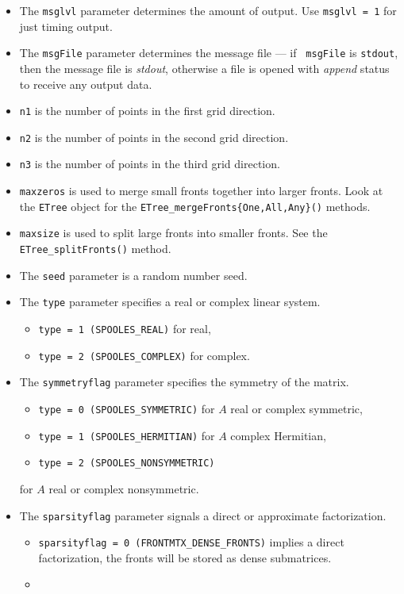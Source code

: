 \begin{enumerate}
\begin{itemize}
\item
The {\tt msglvl} parameter determines the amount of output.
Use {\tt msglvl = 1} for just timing output.
\item
The {\tt msgFile} parameter determines the message file --- if {\tt
msgFile} is {\tt stdout}, then the message file is {\it stdout},
otherwise a file is opened with {\it append} status to receive any
output data.
\item
{\tt n1} is the number of points in the first grid direction.
\item
{\tt n2} is the number of points in the second grid direction.
\item
{\tt n3} is the number of points in the third grid direction.
\item
{\tt maxzeros} is used to merge small fronts together into larger
fronts.
Look at the {\tt ETree} object for
the {\tt ETree\_mergeFronts\{One,All,Any\}()} methods.
\item
{\tt maxsize} is used to split large fronts into smaller
fronts.
See the {\tt ETree\_splitFronts()} method.
\item
The {\tt seed} parameter is a random number seed.
\item
The {\tt type} parameter specifies a real or complex linear system.
\begin{itemize}
\item
{\tt type = 1 (SPOOLES\_REAL)} for real,
\item
{\tt type = 2 (SPOOLES\_COMPLEX)} for complex.
\end{itemize}
\item
The {\tt symmetryflag} parameter specifies the symmetry of the matrix.
\begin{itemize}
\item
{\tt type = 0 (SPOOLES\_SYMMETRIC)} for $A$ real or complex symmetric,
\item
{\tt type = 1 (SPOOLES\_HERMITIAN)} for $A$ complex Hermitian,
\item
{\tt type = 2 (SPOOLES\_NONSYMMETRIC)}
\end{itemize}
for $A$ real or complex nonsymmetric.
\item
The {\tt sparsityflag} parameter signals a direct or approximate
factorization.
\begin{itemize}
\item
{\tt sparsityflag = 0 (FRONTMTX\_DENSE\_FRONTS)} implies a direct
factorization, the fronts will be stored as dense submatrices.
\item

\end{itemize}
\end{itemize}
\end{enumerate}
